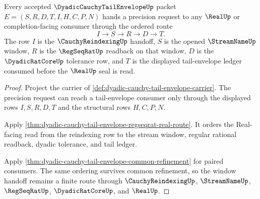 \begin{theorem}
\label{thm:dyadic-cauchy-tail-envelope-window-handoff}
Every accepted $\DyadicCauchyTailEnvelopeUp$ packet $E=(S,R,D,T,I,H,C,P,N)$ hands a precision request to any $\RealUp$ or completion-facing consumer through the ordered route
$$
I \longrightarrow S \longrightarrow R \longrightarrow D \longrightarrow T .
$$
The row $I$ is the $\CauchyReindexingUp$ handoff, $S$ is the opened $\StreamNameUp$ window, $R$ is the $\RegSeqRatUp$ readback on that window, $D$ is the $\DyadicRatCoreUp$ tolerance row, and $T$ is the displayed tail-envelope ledger consumed before the $\RealUp$ seal is read.
\end{theorem}
\begin{proof}
Project the carrier of \autoref{def:dyadic-cauchy-tail-envelope-carrier}. The precision request can reach a tail-envelope consumer only through the displayed rows $I,S,R,D,T$ and the structural rows $H,C,P,N$.

Apply \autoref{thm:dyadic-cauchy-tail-envelope-regseqrat-real-route}. It orders the Real-facing read from the reindexing row to the stream window, regular rational readback, dyadic tolerance, and tail ledger.

Apply \autoref{thm:dyadic-cauchy-tail-envelope-common-refinement} for paired consumers. The same ordering survives common refinement, so the window handoff remains a finite route through $\CauchyReindexingUp$, $\StreamNameUp$, $\RegSeqRatUp$, $\DyadicRatCoreUp$, and $\RealUp$.
\end{proof}

